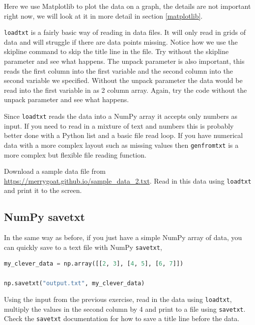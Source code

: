 Here we use Matplotlib to plot the data on a graph, the details are not important right now, we will look at it in more detail in section \ref{matplotlib}.

\texttt{loadtxt} is a fairly basic way of reading in data files. It will only read in grids of data and will struggle if there are data points missing. Notice how we use the skipline command to skip the title line in the file. Try without the skipline parameter and see what happens. The unpack parameter is also important, this reads the first column into the first variable and the second column into the second variable we specified. Without the unpack parameter the data would be read into the first variable in as 2 column array. Again, try the code without the unpack parameter and see what happens.

Since \texttt{loadtxt} reads the data into a NumPy array it accepts only numbers as input. If you need to read in a mixture of text and numbers this is probably better done with a Python list and a basic file read loop. If you have numerical data with a more complex layout such as missing values then \texttt{genfromtxt} is a more complex but flexible file reading function.

\begin{task}Download a sample data file from \url{https://merrygoat.github.io/sample_data_2.txt}. Read in this data using \texttt{loadtxt} and print it to the screen.\end{task}

	\subsection{NumPy savetxt}
		In the same way as before, if you just have a simple NumPy array of data, you can quickly save to a text file with NumPy \texttt{savetxt},
		\begin{lstlisting}[language=Python]
my_clever_data = np.array([[2, 3], [4, 5], [6, 7]])

np.savetxt("output.txt", my_clever_data)\end{lstlisting}

\begin{task}Using the input from the previous exercise, read in the data using \texttt{loadtxt}, multiply the values in the second column by 4 and print to a file using \texttt{savetxt}. Check the \texttt{savetxt} documentation for how to save a title line before the data.\end{task}

